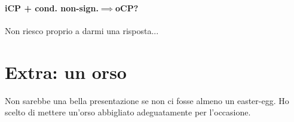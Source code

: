 \documentclass[a4]{article}
\begin{document}
\paragraph{iCP + cond. non-sign.\(\implies\)oCP?} 
Non riesco proprio a darmi una risposta...

\printbibliography

\section{Extra: un orso}
Non sarebbe una bella presentazione se non ci fosse almeno un easter-egg. Ho scelto
di mettere un'orso abbigliato adeguatamente per l'occasione.
\begin{figure}[h!]
	\centering
	\resizebox{0.9\textwidth}{!}{}
\end{figure}
	
\end{document}
